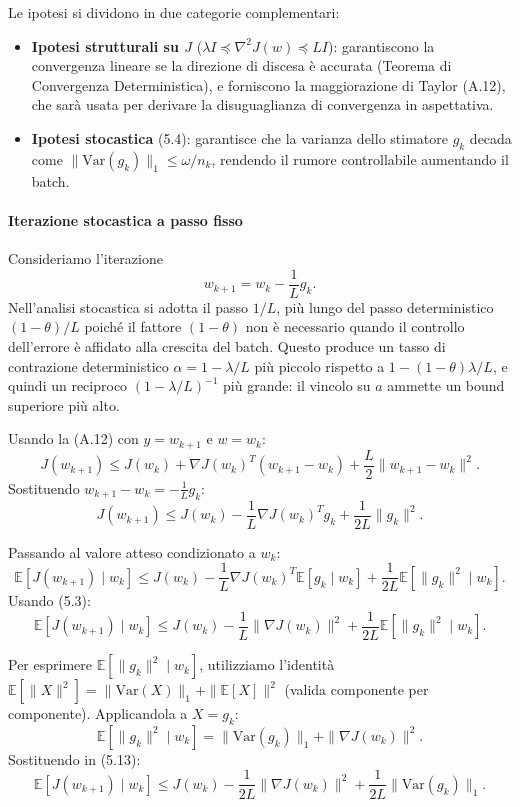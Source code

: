 \documentclass[a4paper,12pt]{article}
\numberwithin{equation}{section}
\numberwithin{figure}{section}
\numberwithin{table}{section}
\begin{document}
Le ipotesi si dividono in due categorie complementari:
\begin{itemize}
    \item \textbf{Ipotesi strutturali su \(J\)} (\(\lambda I \preceq \nabla^2 J(w) \preceq LI\)): garantiscono la convergenza lineare se la direzione di discesa è accurata (Teorema di Convergenza Deterministica), e forniscono la maggiorazione di Taylor (A.12), che sarà usata per derivare la disuguaglianza di convergenza in aspettativa.
    \item \textbf{Ipotesi stocastica} (5.4): garantisce che la varianza dello stimatore \(g_k\) decada come \(\|\mathrm{Var}(g_k)\|_1 \le \omega/n_k\), rendendo il rumore controllabile aumentando il batch.
\end{itemize}

\paragraph{Iterazione stocastica a passo fisso}

Consideriamo l'iterazione
\[
w_{k+1} = w_k - \frac{1}{L} g_k. \tag{5.10}
\]
Nell'analisi stocastica si adotta il passo $1/L$, più lungo del passo deterministico $(1-\theta)/L$ poiché il fattore $(1-\theta)$ non è necessario quando il controllo dell'errore è affidato alla crescita del batch. Questo produce un tasso di contrazione deterministico $\alpha = 1-\lambda/L$ più piccolo rispetto a $1-(1-\theta)\lambda/L$, e quindi un reciproco $(1-\lambda/L)^{-1}$ più grande: il vincolo su $a$ ammette un bound superiore più alto.

Usando la (A.12) con \(y = w_{k+1}\) e \(w = w_k\):
\[
J(w_{k+1}) \le J(w_k) + \nabla J(w_k)^T (w_{k+1} - w_k) + \frac{L}{2}\|w_{k+1} - w_k\|^2. \tag{5.11}
\]
Sostituendo \(w_{k+1} - w_k = -\frac{1}{L}g_k\):
\[
J(w_{k+1}) \le J(w_k) - \frac{1}{L}\nabla J(w_k)^T g_k + \frac{1}{2L}\|g_k\|^2. \tag{5.12}
\]

Passando al valore atteso condizionato a \(w_k\):
\[
\mathbb{E}[J(w_{k+1}) \mid w_k] \le J(w_k) - \frac{1}{L}\nabla J(w_k)^T \mathbb{E}[g_k \mid w_k] + \frac{1}{2L}\mathbb{E}[\|g_k\|^2 \mid w_k].
\]
Usando (5.3):
\[
\mathbb{E}[J(w_{k+1}) \mid w_k] \le J(w_k) - \frac{1}{L}\|\nabla J(w_k)\|^2 + \frac{1}{2L}\mathbb{E}[\|g_k\|^2 \mid w_k]. \tag{5.13}
\]

Per esprimere \(\mathbb{E}[\|g_k\|^2 \mid w_k]\), utilizziamo l'identità \(\mathbb{E}[\|X\|^2] = \|\mathrm{Var}(X)\|_1 + \|\mathbb{E}[X]\|^2\) (valida componente per componente). Applicandola a \(X = g_k\):
\[
\mathbb{E}[\|g_k\|^2 \mid w_k] = \|\mathrm{Var}(g_k)\|_1 + \|\nabla J(w_k)\|^2. \tag{5.14}
\]
Sostituendo in (5.13):
\[
\mathbb{E}[J(w_{k+1}) \mid w_k] \le J(w_k) - \frac{1}{2L}\|\nabla J(w_k)\|^2 + \frac{1}{2L}\|\mathrm{Var}(g_k)\|_1. \tag{5.15}
\]
\end{document}
